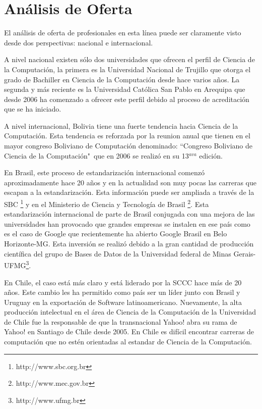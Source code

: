 \section{Análisis de Oferta}\label{sec:cs-analisis-de-oferta}
El análisis de oferta de profesionales en esta línea puede ser claramente visto desde dos perspectivas: nacional e internacional.

A nivel nacional existen sólo dos universidades que ofrecen el perfil de Ciencia de la Computación, la primera es la Universidad Nacional de Trujillo que otorga el grado de Bachiller en Ciencia de la Computación desde hace varios años. La segunda y más reciente es la Universidad Católica San Pablo en Arequipa que desde 2006 ha comenzado a ofrecer este perfil debido al proceso de acreditación que se ha iniciado.

A nivel internacional, Bolivia tiene una fuerte tendencia hacia Ciencia de la Computación. Esta tendencia es reforzada por la reunion anual que tienen en el mayor congreso Boliviano de Computación denominado: ``Congreso Boliviano de Ciencia de la Computación"~que en 2006 se realizó en su 13$^{ava}$ edición.

En Brasil, este proceso de estandarización internacional comenzó aproximadamente hace 20 años y en la actualidad son muy pocas las carreras que escapan a la estandarización. Esta información puede ser ampliada a través de la \ac{SBC} \footnote{http://www.sbc.org.br} y en el Ministerio de Ciencia y Tecnología de Brasil \footnote{http://www.mec.gov.br}. Esta estandarización internacional de parte de Brasil conjugada con una mejora de las universidades han provocado que grandes empresas se instalen en ese país como es el caso de Google que recientemente ha abierto Google Brasil en Belo Horizonte-MG. Esta inversión se realizó debido a la gran cantidad de producción científica del grupo de Bases de Datos de la Universidad federal de Minas Gerais-UFMG\footnote{http://www.ufmg.br}.

En Chile, el caso está más claro y está liderado por la \ac{SCCC} hace más de 20 años. Este cambio les ha permitido como país ser un líder junto con Brasil y Uruguay en la exportación de Software latinoamericano. Nuevamente, la alta producción intelectual en el área de Ciencia de la Computación de la Universidad de Chile fue la responsable de que la transnacional Yahoo! abra su rama de Yahoo! en Santiago de Chile desde 2005. En Chile es difícil encontrar carreras de computación que no estén orientadas al estandar de Ciencia de la Computación.

